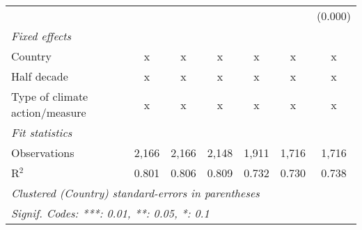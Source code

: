 \begin{tabular}{lcccccc}
                                                     &         &                &                &                &                & (0.000)\\   
   \emph{Fixed effects}\\
   Country                                           & x       & x              & x              & x              & x              & x\\  
   Half decade                                       & x       & x              & x              & x              & x              & x\\  
   Type of climate action/measure                    & x       & x              & x              & x              & x              & x\\  
   \midrule \emph{Fit statistics}\\
   Observations                                      & 2,166   & 2,166          & 2,148          & 1,911          & 1,716          & 1,716\\  
   R$^2$                                             & 0.801   & 0.806          & 0.809          & 0.732          & 0.730          & 0.738\\  
   \midrule
   \multicolumn{7}{l}{\emph{Clustered (Country) standard-errors in parentheses}}\\
   \multicolumn{7}{l}{\emph{Signif. Codes: ***: 0.01, **: 0.05, *: 0.1}}\\
\end{tabular}
\par\endgroup


